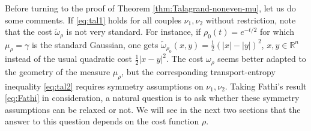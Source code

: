 \documentclass[10pt]{amsart}
\theoremstyle{definition}
\theoremstyle{remark}
\newcommand{\R}{\mathbb{R}}
\begin{document}
Before turning to the proof of Theorem \ref{thm:Talagrand-noneven-mu}, let us do some comments. If \eqref{eq:tal1} holds for all couples $\nu_1,\nu_2$ without restriction, note that the cost $\tilde{\omega}_\rho$ is not very standard. For instance, if $\rho_0(t)=e^{-t/2}$ for which $\mu_\rho = \gamma$ is the standard Gaussian, one gets $\tilde{\omega}_{\rho_0}(x,y) = \frac{1}{2}(|x|-|y|)^2$, $x,y\in \R^n$ instead of the usual quadratic cost $\frac{1}{2}|x-y|^2$. The cost $\omega_\rho$ seems better adapted to the geometry of the measure $\mu_\rho$, but the corresponding transport-entropy inequality \eqref{eq:tal2} requires symmetry assumptions on $\nu_1,\nu_2$. Taking Fathi's result \eqref{eq:Fathi} in consideration, a natural question is to ask whether these symmetry assumptions can be relaxed or not. We will see in the next two sections that the answer to this question depends on the cost function $\rho$. 
\end{document}
